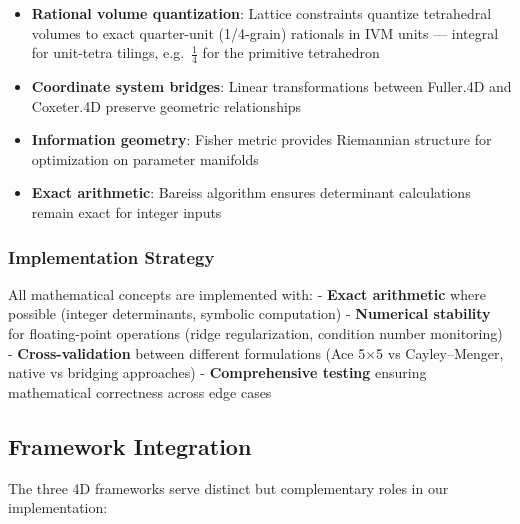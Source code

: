 \documentclass[
  10pt,
]{article}
\providecommand{\tightlist}{%
  \setlength{\itemsep}{0pt}\setlength{\parskip}{0pt}}
\begin{document}
\begin{itemize}
\tightlist
\item
  \textbf{Rational volume quantization}: Lattice constraints quantize
  tetrahedral volumes to exact quarter-unit (1/4-grain) rationals in IVM
  units --- integral for unit-tetra tilings, e.g.~\(\tfrac14\) for the
  primitive tetrahedron
\item
  \textbf{Coordinate system bridges}: Linear transformations between
  Fuller.4D and Coxeter.4D preserve geometric relationships
\item
  \textbf{Information geometry}: Fisher metric provides Riemannian
  structure for optimization on parameter manifolds
\item
  \textbf{Exact arithmetic}: Bareiss algorithm ensures determinant
  calculations remain exact for integer inputs
\end{itemize}

\subsubsection{Implementation Strategy}\label{implementation-strategy}

All mathematical concepts are implemented with: - \textbf{Exact
arithmetic} where possible (integer determinants, symbolic computation)
- \textbf{Numerical stability} for floating-point operations (ridge
regularization, condition number monitoring) - \textbf{Cross-validation}
between different formulations (Ace 5×5 vs Cayley--Menger, native vs
bridging approaches) - \textbf{Comprehensive testing} ensuring
mathematical correctness across edge cases

\subsection{Framework Integration}\label{framework-integration}

The three 4D frameworks serve distinct but complementary roles in our
implementation:
\end{document}
